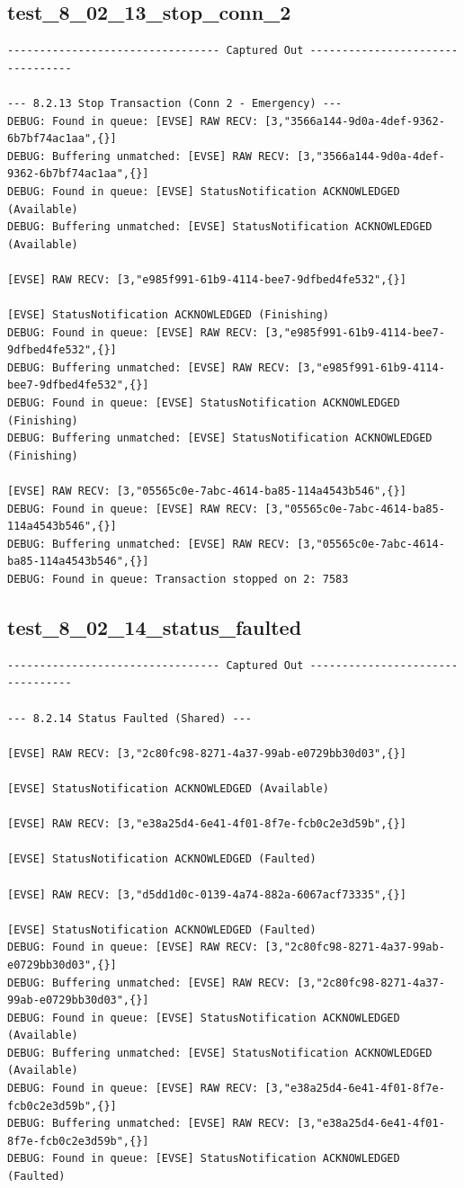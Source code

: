 \documentclass{article}
\begin{document}
\subsection*{test\_8\_02\_13\_stop\_conn\_2}
\begin{lstlisting}
--------------------------------- Captured Out ---------------------------------

--- 8.2.13 Stop Transaction (Conn 2 - Emergency) ---
DEBUG: Found in queue: [EVSE] RAW RECV: [3,"3566a144-9d0a-4def-9362-6b7bf74ac1aa",{}]
DEBUG: Buffering unmatched: [EVSE] RAW RECV: [3,"3566a144-9d0a-4def-9362-6b7bf74ac1aa",{}]
DEBUG: Found in queue: [EVSE] StatusNotification ACKNOWLEDGED (Available)
DEBUG: Buffering unmatched: [EVSE] StatusNotification ACKNOWLEDGED (Available)

[EVSE] RAW RECV: [3,"e985f991-61b9-4114-bee7-9dfbed4fe532",{}]

[EVSE] StatusNotification ACKNOWLEDGED (Finishing)
DEBUG: Found in queue: [EVSE] RAW RECV: [3,"e985f991-61b9-4114-bee7-9dfbed4fe532",{}]
DEBUG: Buffering unmatched: [EVSE] RAW RECV: [3,"e985f991-61b9-4114-bee7-9dfbed4fe532",{}]
DEBUG: Found in queue: [EVSE] StatusNotification ACKNOWLEDGED (Finishing)
DEBUG: Buffering unmatched: [EVSE] StatusNotification ACKNOWLEDGED (Finishing)

[EVSE] RAW RECV: [3,"05565c0e-7abc-4614-ba85-114a4543b546",{}]
DEBUG: Found in queue: [EVSE] RAW RECV: [3,"05565c0e-7abc-4614-ba85-114a4543b546",{}]
DEBUG: Buffering unmatched: [EVSE] RAW RECV: [3,"05565c0e-7abc-4614-ba85-114a4543b546",{}]
DEBUG: Found in queue: Transaction stopped on 2: 7583
\end{lstlisting}
\subsection*{test\_8\_02\_14\_status\_faulted}
\begin{lstlisting}
--------------------------------- Captured Out ---------------------------------

--- 8.2.14 Status Faulted (Shared) ---

[EVSE] RAW RECV: [3,"2c80fc98-8271-4a37-99ab-e0729bb30d03",{}]

[EVSE] StatusNotification ACKNOWLEDGED (Available)

[EVSE] RAW RECV: [3,"e38a25d4-6e41-4f01-8f7e-fcb0c2e3d59b",{}]

[EVSE] StatusNotification ACKNOWLEDGED (Faulted)

[EVSE] RAW RECV: [3,"d5dd1d0c-0139-4a74-882a-6067acf73335",{}]

[EVSE] StatusNotification ACKNOWLEDGED (Faulted)
DEBUG: Found in queue: [EVSE] RAW RECV: [3,"2c80fc98-8271-4a37-99ab-e0729bb30d03",{}]
DEBUG: Buffering unmatched: [EVSE] RAW RECV: [3,"2c80fc98-8271-4a37-99ab-e0729bb30d03",{}]
DEBUG: Found in queue: [EVSE] StatusNotification ACKNOWLEDGED (Available)
DEBUG: Buffering unmatched: [EVSE] StatusNotification ACKNOWLEDGED (Available)
DEBUG: Found in queue: [EVSE] RAW RECV: [3,"e38a25d4-6e41-4f01-8f7e-fcb0c2e3d59b",{}]
DEBUG: Buffering unmatched: [EVSE] RAW RECV: [3,"e38a25d4-6e41-4f01-8f7e-fcb0c2e3d59b",{}]
DEBUG: Found in queue: [EVSE] StatusNotification ACKNOWLEDGED (Faulted)
\end{lstlisting}
\end{document}
